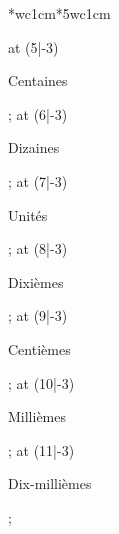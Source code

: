 {{{\begin{center}
\begin{NiceTabular}{*{}{wc{1cm}}*{5}{wc{1cm}}}
{{            \tikz\node[rotate=58] at (5|-3) {\begin{minipage}{1.5cm}\begin{center}\scriptsize Centaines\end{center}\end{minipage}};
            \tikz\node[rotate=58] at (6|-3) {\begin{minipage}{1.5cm}\begin{center}\scriptsize Dizaines\end{center}\end{minipage}};
            \tikz\node[rotate=58] at (7|-3) {\begin{minipage}{1.5cm}\begin{center}\scriptsize Unités\end{center}\end{minipage}};
            \tikz\node[rotate=58] at (8|-3) {\begin{minipage}{1.5cm}\begin{center}\scriptsize Dixièmes\end{center}\end{minipage}};
            \tikz\node[rotate=58] at (9|-3) {\begin{minipage}{1.5cm}\begin{center}\scriptsize Centièmes\end{center}\end{minipage}};
            \tikz\node[rotate=58] at (10|-3) {\begin{minipage}{1.5cm}\begin{center}\scriptsize Millièmes\end{center}\end{minipage}};
            \tikz\node[rotate=58] at (11|-3) {\begin{minipage}{2cm}\begin{center}\scriptsize Dix-millièmes\end{center}\end{minipage}};
          }%
        }%
      \end{NiceTabular}%
    \end{center}%
    \setlength{\tabcolsep}{100\tabcolsep}%
  }{}%
  }}
